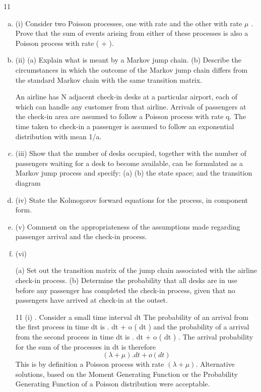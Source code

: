 \documentclass[a4paper,12pt]{article}
\begin{document}
\begin{enumerate}
11
\begin{enumerate}[(a)]
\item (i) Consider two Poisson processes, one with rate \lambda and the other with rate $\mu$ .
Prove that the sum of events arising from either of these processes is also a Poisson process with rate ( \lambda + \mu ).

\item (ii) (a) Explain what is meant by a Markov jump chain.
(b) Describe the circumstances in which the outcome of the Markov jump chain differs from the standard Markov chain with the same transition
matrix.

An airline has N adjacent check-in desks at a particular airport, each of which can handle any customer from that airline. Arrivals of passengers at the check-in area are assumed to follow a Poisson process with rate q. The time taken to check-in a passenger is assumed to follow an exponential distribution with mean 1/a.
\item (iii)
Show that the number of desks occupied, together with the number of passengers waiting for a desk to become available, can be formulated as a Markov jump process and specify:
(a)
(b)
the state space; and
the transition diagram

\item 
(iv) State the Kolmogorov forward equations for the process, in component form.

\item 
(v) Comment on the appropriateness of the assumptions made regarding passenger arrival and the check-in process.

\item (vi)

(a) Set out the transition matrix of the jump chain associated with the airline check-in process.
(b) Determine the probability that all desks are in use before any passenger has completed the check-in process, given that no passengers have
arrived at check-in at the outset.

\newpage

11
(i)
.
Consider a small time interval dt
The probability of an arrival from the first process in time dt is
\lambda . dt + o ( dt ) and the probability of a arrival from the second process in time dt
is \mu . dt + o ( dt ) .
The arrival probability for the sum of the processes in dt is therefore
\[( \lambda + \mu ). dt + o ( dt )\]
This is by definition a Poisson process with rate $( \lambda + \mu )$.
Alternative solutions, based on the Moment Generating Function or the
Probability Generating Function of a Poisson distribution were acceptable.


\end{enumerate}
\end{enumerate}
\end{document}
